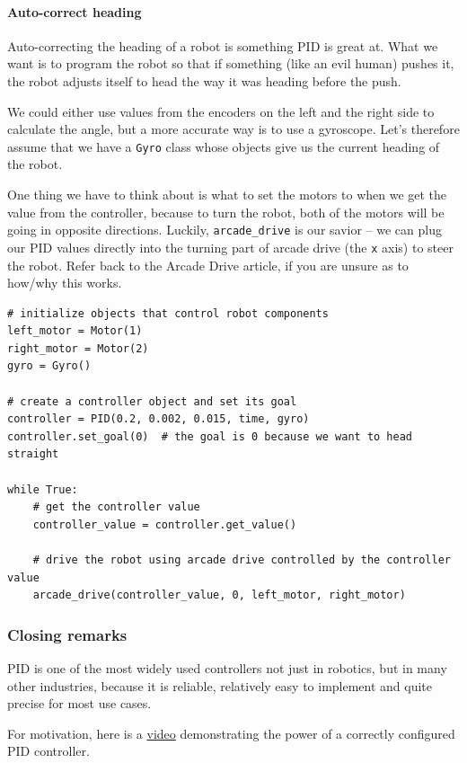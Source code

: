 \documentclass[12pt,twoside]{article}
\let\subsubsubsection\paragraph
\begin{document}
\subsubsubsection{Auto-correct heading}
Auto-correcting the heading of a robot is something PID is great at. What we want is to program the robot so that if something (like an evil human) pushes it, the robot adjusts itself to head the way it was heading before the push.

We could either use values from the encoders on the left and the right side to calculate the angle, but a more accurate way is to use a gyroscope. Let's therefore assume that we have a \texttt{Gyro} class whose objects give us the current heading of the robot.

One thing we have to think about is what to set the motors to when we get the value from the controller, because to turn the robot, both of the motors will be going in opposite directions. Luckily, \texttt{arcade\_drive} is our savior -- we can plug our PID values directly into the turning part of arcade drive (the \texttt{x} axis) to steer the robot. Refer back to the Arcade Drive article, if you are unsure as to how/why this works.

\begin{verbatim}
# initialize objects that control robot components
left_motor = Motor(1)
right_motor = Motor(2)
gyro = Gyro()

# create a controller object and set its goal
controller = PID(0.2, 0.002, 0.015, time, gyro)
controller.set_goal(0)  # the goal is 0 because we want to head straight

while True:
    # get the controller value
    controller_value = controller.get_value()

    # drive the robot using arcade drive controlled by the controller value
    arcade_drive(controller_value, 0, left_motor, right_motor)
\end{verbatim}



\subsubsection{Closing remarks}
PID is one of the most widely used controllers not just in robotics, but in many other industries, because it is reliable, relatively easy to implement and quite precise for most use cases.

For motivation, here is a \href{https://www.youtube.com/watch?v=4Y7zG48uHRo}{video} demonstrating the power of a correctly configured PID controller.
\end{document}

